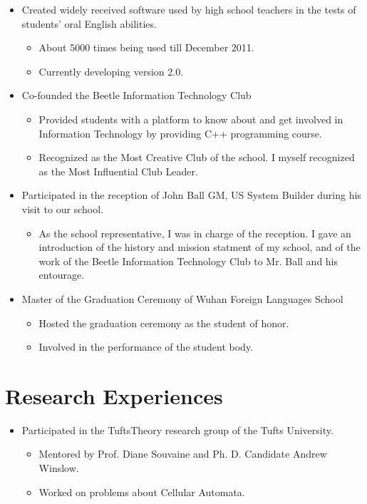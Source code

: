 \documentclass[margin]{res}
\begin{document}
\begin{resume}
\begin{itemize}
    \item{
        Created widely received software used by high school teachers in the tests of students' oral English abilities. 
        \begin{itemize}
            \item{About 5000 times being used till December 2011. }
            \item{Currently developing version 2.0. }
        \end{itemize}
        }
    \item{
        Co-founded the Beetle Information Technology Club 
        \begin{itemize}
            \item{Provided students with a platform to know about and get involved in Information Technology by providing C++ programming course. }
            \item{Recognized as the Most Creative Club of the school. I myself recognized as the Most Influential Club Leader. }
        \end{itemize}
        }
    \item{
        Participated in the reception of John Ball GM, US System Builder during his visit to our school. 
        \begin{itemize}
            \item{As the school representative, I was in charge of the reception. I gave an introduction of the history and mission statment of my school, and of the work of the Beetle Information Technology Club to Mr. Ball and his entourage. }
        \end{itemize}
        }
    \item{
        Master of the Graduation Ceremony of Wuhan Foreign Languages School 
        \begin{itemize}
            \item{Hosted the graduation ceremony as the student of honor. }
            \item{Involved in the performance of the student body. }
        \end{itemize}
        }
\end{itemize}

\section{Research Experiences}

\begin{itemize}
    \item{
        Participated in the TuftsTheory research group of the Tufts University. 
        \begin{itemize}
            \item{Mentored by Prof. Diane Souvaine and Ph. D. Candidate Andrew Winslow. }
            \item{Worked on problems about Cellular Automata. }
        \end{itemize}
    }
\end{itemize}


\end{resume}
\end{document}
